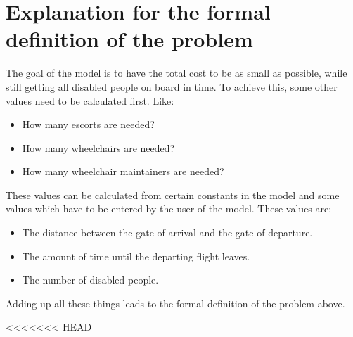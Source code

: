 \documentclass[a4paper, 11pt, notitlepage]{report}
\begin{document}
	\section{Explanation for the formal definition of the problem}
	The goal of the model is to have the total cost to be as small as possible, while still getting all disabled people on board in time. To achieve this, some other values need to be calculated first. Like:
\begin{itemize}
\itemsep0em
  \item How many escorts are needed?
  \item How many wheelchairs are needed?
  \item How many wheelchair maintainers are needed?
\end{itemize}
These values can be calculated from certain constants in the model and some values which have to be entered by the user of the model. These values are:
\begin{itemize}
\itemsep0em
  \item The distance between the gate of arrival and the gate of departure.
  \item The amount of time until the departing flight leaves.
  \item The number of disabled people.
\end{itemize}
Adding up all these things leads to the formal definition of the problem above.

<<<<<<< HEAD
\end{document}
